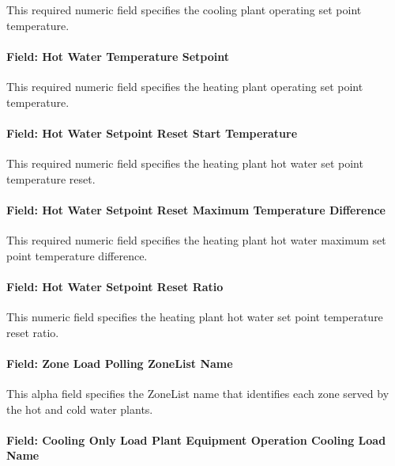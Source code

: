 This required numeric field specifies the cooling plant operating set point temperature.

\paragraph{Field: Hot Water Temperature Setpoint}\label{field-hot-water-temp-setpoint-plantequipmentoperationchillerheaterchangeover}

This required numeric field specifies the heating plant operating set point temperature.

\paragraph{Field: Hot Water Setpoint Reset Start Temperature}\label{field-hot-water-setpoint-reset-start-temp-plantequipmentoperationchillerheaterchangeover}

This required numeric field specifies the heating plant hot water set point temperature reset.

\paragraph{Field: Hot Water Setpoint Reset Maximum Temperature Difference}\label{field-hot-water-setpoint-reset-max-temp-diff-plantequipmentoperationchillerheaterchangeover}

This required numeric field specifies the heating plant hot water maximum set point temperature difference.

\paragraph{Field: Hot Water Setpoint Reset Ratio}\label{field-hot-water-setpoint-reset-ratio-plantequipmentoperationchillerheaterchangeover}

This numeric field specifies the heating plant hot water set point temperature reset ratio.

\paragraph{Field: Zone Load Polling ZoneList Name}\label{field-zone-load-polling-zonelist-name-plantequipmentoperationchillerheaterchangeover}

This alpha field specifies the ZoneList name that identifies each zone served by the hot and cold water plants.

\paragraph{Field: Cooling Only Load Plant Equipment Operation Cooling Load Name}\label{field-cool-only-load-equip-operation-name-plantequipmentoperationchillerheaterchangeover}

